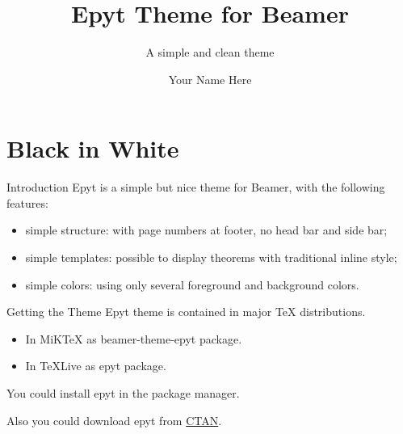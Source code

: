 \documentclass[12pt,xcolor={rgb}]{beamer}
\newcommand{\mylead}[1]{\textcolor{accent1}{#1}}
\newcommand{\mybold}[1]{\textcolor{accent2}{#1}}
\begin{document}
\title{Epyt Theme for Beamer}
\subtitle{A simple and clean theme}
\author{Your Name Here}

\begin{frame}[plain]\transboxout
\titlepage
\end{frame}


\section{Black in White}

\begin{frame}{Introduction}
\mylead{Epyt} is a simple but nice theme for Beamer, with the following features: \pause
\begin{itemize}[<+->]
\item simple structure: with page numbers at footer, no head bar and side bar;
\item simple templates: possible to display theorems with traditional inline style;
\item simple colors: using only several foreground and background colors.
\end{itemize}
\end{frame}

\begin{frame}{Getting the Theme}
\mylead{Epyt} theme is contained in major TeX distributions.
\begin{itemize}
  \item In MiKTeX as \mybold{beamer-theme-epyt} package.
  \item In TeXLive as \mybold{epyt} package.
\end{itemize}
You could install \mylead{epyt} in the package manager.\par\pause
Also you could download \mylead{epyt} from \href{https://www.ctan.org/pkg/epyt}{CTAN}.
\end{frame}

\end{document}

